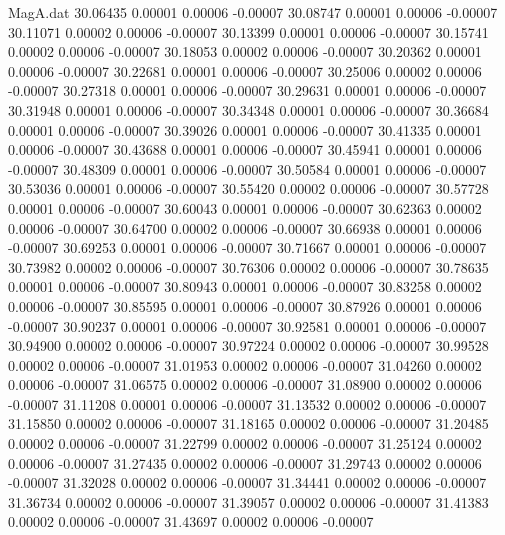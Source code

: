 \begin{filecontents}{MagA.dat}
  30.06435    0.00001    0.00006   -0.00007
  30.08747    0.00001    0.00006   -0.00007
  30.11071    0.00002    0.00006   -0.00007
  30.13399    0.00001    0.00006   -0.00007
  30.15741    0.00002    0.00006   -0.00007
  30.18053    0.00002    0.00006   -0.00007
  30.20362    0.00001    0.00006   -0.00007
  30.22681    0.00001    0.00006   -0.00007
  30.25006    0.00002    0.00006   -0.00007
  30.27318    0.00001    0.00006   -0.00007
  30.29631    0.00001    0.00006   -0.00007
  30.31948    0.00001    0.00006   -0.00007
  30.34348    0.00001    0.00006   -0.00007
  30.36684    0.00001    0.00006   -0.00007
  30.39026    0.00001    0.00006   -0.00007
  30.41335    0.00001    0.00006   -0.00007
  30.43688    0.00001    0.00006   -0.00007
  30.45941    0.00001    0.00006   -0.00007
  30.48309    0.00001    0.00006   -0.00007
  30.50584    0.00001    0.00006   -0.00007
  30.53036    0.00001    0.00006   -0.00007
  30.55420    0.00002    0.00006   -0.00007
  30.57728    0.00001    0.00006   -0.00007
  30.60043    0.00001    0.00006   -0.00007
  30.62363    0.00002    0.00006   -0.00007
  30.64700    0.00002    0.00006   -0.00007
  30.66938    0.00001    0.00006   -0.00007
  30.69253    0.00001    0.00006   -0.00007
  30.71667    0.00001    0.00006   -0.00007
  30.73982    0.00002    0.00006   -0.00007
  30.76306    0.00002    0.00006   -0.00007
  30.78635    0.00001    0.00006   -0.00007
  30.80943    0.00001    0.00006   -0.00007
  30.83258    0.00002    0.00006   -0.00007
  30.85595    0.00001    0.00006   -0.00007
  30.87926    0.00001    0.00006   -0.00007
  30.90237    0.00001    0.00006   -0.00007
  30.92581    0.00001    0.00006   -0.00007
  30.94900    0.00002    0.00006   -0.00007
  30.97224    0.00002    0.00006   -0.00007
  30.99528    0.00002    0.00006   -0.00007
  31.01953    0.00002    0.00006   -0.00007
  31.04260    0.00002    0.00006   -0.00007
  31.06575    0.00002    0.00006   -0.00007
  31.08900    0.00002    0.00006   -0.00007
  31.11208    0.00001    0.00006   -0.00007
  31.13532    0.00002    0.00006   -0.00007
  31.15850    0.00002    0.00006   -0.00007
  31.18165    0.00002    0.00006   -0.00007
  31.20485    0.00002    0.00006   -0.00007
  31.22799    0.00002    0.00006   -0.00007
  31.25124    0.00002    0.00006   -0.00007
  31.27435    0.00002    0.00006   -0.00007
  31.29743    0.00002    0.00006   -0.00007
  31.32028    0.00002    0.00006   -0.00007
  31.34441    0.00002    0.00006   -0.00007
  31.36734    0.00002    0.00006   -0.00007
  31.39057    0.00002    0.00006   -0.00007
  31.41383    0.00002    0.00006   -0.00007
  31.43697    0.00002    0.00006   -0.00007

\end{filecontents}

